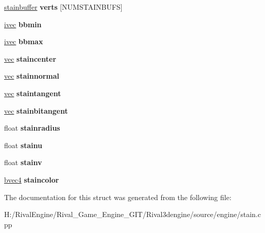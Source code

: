 \begin{DoxyCompactItemize}
\hyperlink{structstainbuffer}{stainbuffer} {\bfseries verts} \mbox{[}N\+U\+M\+S\+T\+A\+I\+N\+B\+U\+FS\mbox{]}
\item 
\mbox{\label{structstainrenderer_a426b87c6ea11bf94b8606f2a4df4b63b}} 
\hyperlink{structivec}{ivec} {\bfseries bbmin}
\item 
\mbox{\label{structstainrenderer_ab4e35639ab7fcb094b1e030c93d28ddd}} 
\hyperlink{structivec}{ivec} {\bfseries bbmax}
\item 
\mbox{\label{structstainrenderer_a374a94546faa7406eebe087e6bacc118}} 
\hyperlink{structvec}{vec} {\bfseries staincenter}
\item 
\mbox{\label{structstainrenderer_aff7006cb650b88585ecb71c355850c73}} 
\hyperlink{structvec}{vec} {\bfseries stainnormal}
\item 
\mbox{\label{structstainrenderer_a60fdf62f49aea0b490a44ceb45c45566}} 
\hyperlink{structvec}{vec} {\bfseries staintangent}
\item 
\mbox{\label{structstainrenderer_ac2439c02738a49a97a7810f1ce066dc8}} 
\hyperlink{structvec}{vec} {\bfseries stainbitangent}
\item 
\mbox{\label{structstainrenderer_ae68d49ff814fd667fcaf983f6daa9ee9}} 
float {\bfseries stainradius}
\item 
\mbox{\label{structstainrenderer_a1c45141459c55a9436f089f8911e3de8}} 
float {\bfseries stainu}
\item 
\mbox{\label{structstainrenderer_a57125f5f739a7666e1e8ff44b1c63882}} 
float {\bfseries stainv}
\item 
\mbox{\label{structstainrenderer_a26c5e1b263ef906829e0c4b95fad763b}} 
\hyperlink{structbvec4}{bvec4} {\bfseries staincolor}
\end{DoxyCompactItemize}


The documentation for this struct was generated from the following file\+:\begin{DoxyCompactItemize}
\item 
H\+:/\+Rival\+Engine/\+Rival\+\_\+\+Game\+\_\+\+Engine\+\_\+\+G\+I\+T/\+Rival3dengine/source/engine/stain.\+cpp\end{DoxyCompactItemize}
